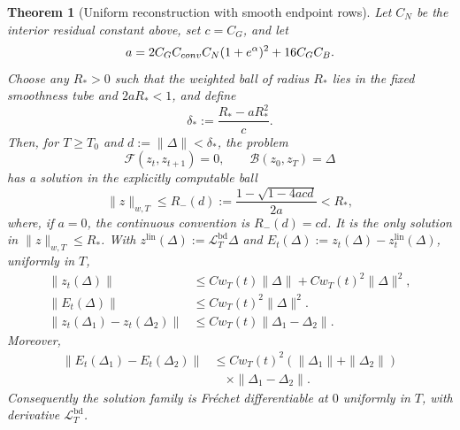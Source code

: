 \documentclass[twocolumn,nameyear,amsthm]{autart}
\newcommand{\B}{\mathcal B}
\newcommand{\bd}{\mathrm{bd}}
\newcommand{\lin}{\mathrm{lin}}
\numberwithin{equation}{section}
\newtheorem{theorem}{Theorem}[section]
\begin{document}
\begin{theorem}[Uniform reconstruction with smooth endpoint rows]
Let $C_N$ be the interior residual constant above, set $c=C_G$, and let
\begin{equation}\label{eq:explicit-a-constant}
 a=2C_GC_{\rm conv}C_N(1+e^\alpha)^2+16C_GC_B .
\end{equation}
Choose any $R_*>0$ such that the weighted ball of radius $R_*$ lies in the
fixed smoothness tube and $2aR_*<1$, and define
\begin{equation}\label{eq:apriori-data-radius}
 \delta_*:=\frac{R_*-aR_*^2}{c}.
\end{equation}
Then, for $T\ge T_0$ and $d:=\|\Delta\|<\delta_*$, the problem
\begin{equation}\label{eq:nonlinear-boundary}
 \mathcal F(z_t,z_{t+1})=0,\qquad \B(z_0,z_T)=\Delta
\end{equation}
has a solution in the explicitly computable ball
\begin{equation}\label{eq:apriori-root-radius}
 \|z\|_{w,T}\le R_-(d):=
 \frac{1-\sqrt{1-4acd}}{2a}<R_* ,
\end{equation}
where, if $a=0$, the continuous convention is $R_-(d)=cd$.  It is the only
solution in $\|z\|_{w,T}\le R_*$.  With
$z^{\lin}(\Delta):=\mathcal L_T^{\bd}\Delta$ and
$E_t(\Delta):=z_t(\Delta)-z_t^{\lin}(\Delta)$, uniformly in $T$,
\begin{align}
\|z_t(\Delta)\|&\le Cw_T(t)\|\Delta\|+Cw_T(t)^2\|\Delta\|^2,
 \label{eq:nonlinear-boundary-estimate}\\
\|E_t(\Delta)\|&\le Cw_T(t)^2\|\Delta\|^2.
 \label{eq:affine-reconstruction-estimate}\\
\|z_t(\Delta_1)-z_t(\Delta_2)\|&\le
Cw_T(t)\|\Delta_1-\Delta_2\|.
\label{eq:nonlinear-boundary-lipschitz}
\end{align}
Moreover,
\begin{equation}
\label{eq:nonlinear-boundary-linearization}
\begin{aligned}
\|E_t(\Delta_1)-E_t(\Delta_2)\|
&\le Cw_T(t)^2(\|\Delta_1\|+\|\Delta_2\|)\\
&\quad{}\times \|\Delta_1-\Delta_2\|.
\end{aligned}
\end{equation}
Consequently the solution family is Fr\'echet differentiable at $0$ uniformly
in $T$, with derivative $\mathcal L_T^{\bd}$.
\end{theorem}
\end{document}
